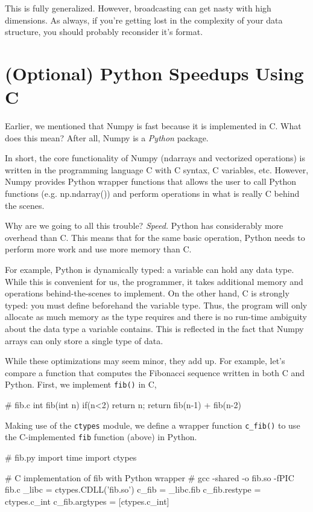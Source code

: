 \documentclass[12pt]{article}
\numberwithin{equation}{section}
\begin{document}
   This is fully generalized. However, broadcasting can get nasty with high dimensions. As always, if you're getting lost in the complexity of your data structure, you should probably reconsider it's format. 
   
  
  \section{(Optional) Python Speedups Using C}
  
  Earlier, we mentioned that Numpy is fast because it is implemented in C. What does this mean? After all, Numpy is a \textit{Python} package. 
  
  In short, the core functionality of Numpy (ndarrays and vectorized operations) is written in the programming language C with C syntax, C variables, etc. However, Numpy provides Python wrapper functions that allows the user to call Python functions (e.g. np.ndarray()) and perform operations in what is really C behind the scenes.
  
  Why are we going to all this trouble? \textit{Speed.} Python has considerably more overhead than C. This means that for the same basic operation, Python needs to perform more work and use more memory than C. 
  
  For example, Python is dynamically typed: a variable can hold any data type. While this is convenient for us, the programmer, it takes additional memory and operations behind-the-scenes to implement. On the other hand, C is strongly typed: you must define beforehand the variable type. Thus, the program will only allocate as much memory as the type requires and there is no run-time ambiguity about the data type a variable contains. This is reflected in the fact that  Numpy arrays can only store a single type of data.
  
  While these optimizations may seem minor, they add up. For example, let's compare a function that computes the Fibonacci sequence written in both C and Python. First, we implement \verb|fib()| in C,
  
  \begin{python}
	# fib.c
	int fib(int n) {
	    if(n<2) {
	       return n;
	    }
	    return fib(n-1) + fib(n-2)
	}
  \end{python}
	
	Making use of the \verb|ctypes| module, we define a wrapper function \verb|c_fib()| to use the C-implemented \verb|fib| function (above) in Python. 

\begin{python}
	# fib.py
	import time
	import ctypes
	
	# C implementation of fib with Python wrapper
	# gcc -shared -o fib.so -fPIC fib.c
	_libc = ctypes.CDLL('fib.so')
	c_fib = _libc.fib
	c_fib.restype = ctypes.c_int
	c_fib.argtypes = [ctypes.c_int]
	
	
\end{python}
\end{document}
